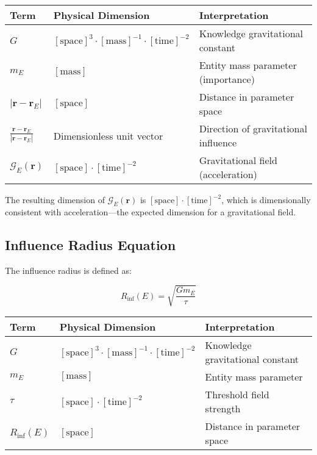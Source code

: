 \begin{center}
\label{tab:dimensional_analysis_grav_field}
\begin{tabular}{p{3cm} p{5cm} p{6cm}}
\textbf{Term} & \textbf{Physical Dimension} & \textbf{Interpretation} \\
\hline
$G$ & $[\text{space}]^3 \cdot [\text{mass}]^{-1} \cdot [\text{time}]^{-2}$ & Knowledge gravitational constant \\
$m_E$ & $[\text{mass}]$ & Entity mass parameter (importance) \\
$|\mathbf{r} - \mathbf{r}_E|$ & $[\text{space}]$ & Distance in parameter space \\
$\frac{\mathbf{r} - \mathbf{r}_E}{|\mathbf{r} - \mathbf{r}_E|}$ & Dimensionless unit vector & Direction of gravitational influence \\
\hline
$\mathcal{G}_E(\mathbf{r})$ & $[\text{space}] \cdot [\text{time}]^{-2}$ & Gravitational field (acceleration) \\
\hline
\end{tabular}
\end{center}

The resulting dimension of $\mathcal{G}_E(\mathbf{r})$ is $[\text{space}] \cdot [\text{time}]^{-2}$, which is dimensionally consistent with acceleration—the expected dimension for a gravitational field.

\subsection{Influence Radius Equation}

The influence radius is defined as:

\begin{equation}
R_{\text{inf}}(E) = \sqrt{\frac{G m_E}{\tau}}
\end{equation}

\begin{center}
\label{tab:dimensional_analysis_influence_radius}
\begin{tabular}{p{3cm} p{5cm} p{6cm}}
\textbf{Term} & \textbf{Physical Dimension} & \textbf{Interpretation} \\
\hline
$G$ & $[\text{space}]^3 \cdot [\text{mass}]^{-1} \cdot [\text{time}]^{-2}$ & Knowledge gravitational constant \\
$m_E$ & $[\text{mass}]$ & Entity mass parameter \\
$\tau$ & $[\text{space}] \cdot [\text{time}]^{-2}$ & Threshold field strength \\
\hline
$R_{\text{inf}}(E)$ & $[\text{space}]$ & Distance in parameter space \\
\hline
\end{tabular}
\end{center}

